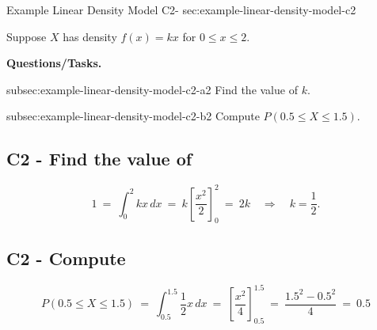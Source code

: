 	\sectionScored
	{Example Linear Density Model}
	{C2-}
	{sec:example-linear-density-model-c2}
	{
	Suppose $X$ has density $f(x)=kx$ for $0\le x\le 2$.
	
	\textbf{Questions/Tasks.}
	\begin{enumerate}
		\CriterionTask
		{subsec:example-linear-density-model-c2-a}{2}
		{Find the value of $k$. }
		
		\CriterionTask
		{subsec:example-linear-density-model-c2-b}{2}
		{Compute $P(0.5\le X\le 1.5)$. }
	\end{enumerate}
	
	\label{subsec:example-linear-density-model-c2-a}
	\subsection*{C2 - Find the value of  }
	
	\[
	1 \> = \> \int_0^2 kx\,dx 
	\> = \> k\left[\frac{x^2}{2}\right]_0^2 
	\> = \> 2k
	\quad\Rightarrow\quad
	k=\frac12.
	\]
	
	
	\vspace{-5mm}
	
	\label{subsec:example-linear-density-model-c2-b}
	\subsection*{C2 - Compute  }
	
	\[
	P(0.5\le X\le 1.5)
	\> = \> \int_{0.5}^{1.5}\frac12 x\,dx
	\> = \> \left[\frac{x^2}{4}\right]_{0.5}^{1.5}
	\> = \> \frac{1.5^2-0.5^2}{4}
	\> = \> 0.5
	\]
	
	\vspace{-5mm}
	}
	
